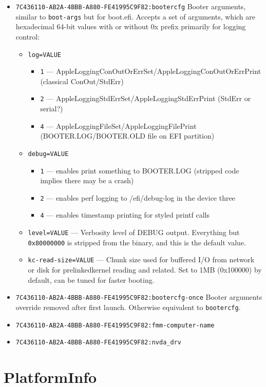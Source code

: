 \documentclass[]{article}
\begin{document}
\begin{itemize}
\item
  \texttt{7C436110-AB2A-4BBB-A880-FE41995C9F82:bootercfg}
  \break
  Booter arguments, similar to \texttt{boot-args} but for boot.efi. Accepts a set of
  arguments, which are hexadecimal 64-bit values with or without 0x prefix primarily
  for logging control:
  \begin{itemize}
  \item \texttt{log=VALUE}
    \begin{itemize}
    \item \texttt{1} --- AppleLoggingConOutOrErrSet/AppleLoggingConOutOrErrPrint
    (classical ConOut/StdErr)
    \item \texttt{2} --- AppleLoggingStdErrSet/AppleLoggingStdErrPrint (StdErr or serial?)
    \item \texttt{4} --- AppleLoggingFileSet/AppleLoggingFilePrint (BOOTER.LOG/BOOTER.OLD
    file on EFI partition)
    \end{itemize}
  \item \texttt{debug=VALUE}
  \begin{itemize}
  \item \texttt{1} --- enables print something to BOOTER.LOG (stripped code implies there
  may be a crash)
  \item \texttt{2} --- enables perf logging to /efi/debug-log in the device three
  \item \texttt{4} --- enables timestamp printing for styled printf calls
  \end{itemize}
  \item \texttt{level=VALUE} --- Verbosity level of DEBUG output. Everything but
  \texttt{0x80000000} is stripped from the binary, and this is the default value.
  \item \texttt{kc-read-size=VALUE} --- Chunk size used for buffered I/O from network or
  disk for prelinkedkernel reading and related. Set to 1MB (0x100000) by default, can be
  tuned for faster booting.
\end{itemize}
\item \texttt{7C436110-AB2A-4BBB-A880-FE41995C9F82:bootercfg-once}
  \break
  Booter arguments override removed after first launch. Otherwise equivalent to \texttt{bootercfg}.
\item
  \texttt{7C436110-AB2A-4BBB-A880-FE41995C9F82:fmm-computer-name}
\item
  \texttt{7C436110-AB2A-4BBB-A880-FE41995C9F82:nvda\_drv}
\end{itemize}

\section{PlatformInfo}\label{platforminfo}
\end{document}
